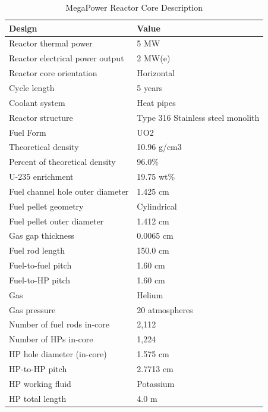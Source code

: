 \pagebreak
\begin{table} [hbtp]
\begin{center}

\caption{MegaPower Reactor Core Description}
\label{Megatable}
\begin{tabular}{l     l}
\hline 
Design 		&Value \\ 
\hline 
Reactor thermal power&5 MW                                             \\
Reactor electrical power output&2 MW(e)                                       \\
Reactor core orientation&Horizontal                                       \\
Cycle length&5 years                                           \\
Coolant system&Heat pipes                                      \\
Reactor structure&Type 316 Stainless steel monolith    \\
\hline 
Fuel Form&UO2                      \\
Theoretical density&10.96 g/cm3           \\
Percent of theoretical density&96.0\%                   \\
U-235 enrichment&19.75 wt\%             \\
Fuel channel hole outer diameter&1.425 cm               \\
Fuel pellet geometry&Cylindrical              \\
Fuel pellet outer diameter&1.412 cm               \\
Gas gap thickness&0.0065 cm             \\
Fuel rod length&150.0 cm               \\
Fuel-to-fuel pitch&1.60 cm                 \\
Fuel-to-HP pitch&1.60 cm                 \\
Gas&Helium                   \\
Gas pressure&20 atmospheres   \\
Number of fuel rods in-core&2,112                     \\
\hline 
Number of HPs in-core&1,224         \\
HP hole diameter (in-core)&1.575 cm    \\
HP-to-HP pitch&2.7713 cm  \\
HP working fluid&Potassium  \\
HP total length&4.0 m         \\

\end{tabular}
\end{center}
\end{table}
